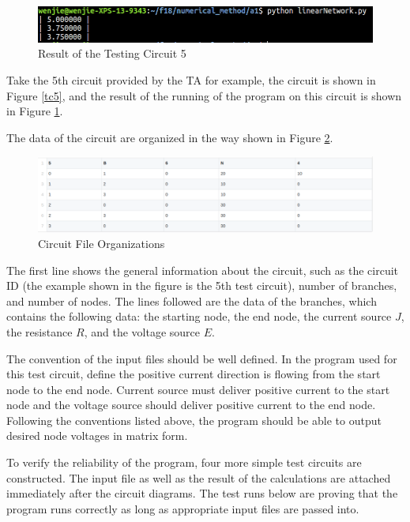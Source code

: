 \documentclass[a4paper,titlepage]{article}
\begin{document}
			\begin{figure}[!h]
				\centering
				\includegraphics[width=\linewidth]{tc5_result}
				\caption{Result of the Testing Circuit 5}
				\label{tc5_result}
			\end{figure}
			
			Take the 5th circuit provided by the TA for example, the circuit is shown in Figure \ref{tc5}, and the result of the running of the program on this circuit is shown in Figure \ref{tc5_result}.
						
			The data of the circuit are organized in the way shown in Figure \ref{lin_network_org}.
			\begin{figure}[!h]
				\centering
				\includegraphics[width=\linewidth]{lin_network_org}
				\caption{Circuit File Organizations}
				\label{lin_network_org}
			\end{figure}
			The first line shows the general information about the circuit, such as the circuit ID (the example shown in the figure is the 5th test circuit), number of branches, and number of nodes. The lines followed are the data of the branches, which contains the following data: the starting node, the end node, the current source $J$, the resistance $R$, and the voltage source $E$.
			
			The convention of the input files should be well defined. In the program used for this test circuit, define the positive current direction is flowing from the start node to the end node. Current source must deliver positive current to the start node and the voltage source should deliver positive current to the end node. Following the conventions listed above, the program should be able to output desired node voltages in matrix form. 
			
			To verify the reliability of the program, four more simple test circuits are constructed. The input file as well as the result of the calculations are attached immediately after the circuit diagrams. The test runs below are proving that the program runs correctly as long as appropriate input files are passed into.
\end{document}
